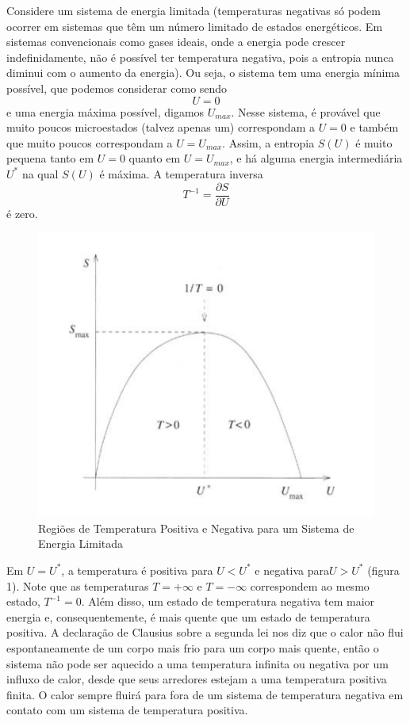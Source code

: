 \documentclass[12pt]{article}
\begin{document}
\begin{itemize}
     Considere um sistema de energia limitada (temperaturas negativas só podem ocorrer em sistemas que têm um número limitado de estados energéticos. Em sistemas convencionais como gases ideais, onde a energia pode crescer indefinidamente, não é possível ter temperatura negativa, pois a entropia nunca diminui com o aumento da energia). Ou seja, o sistema tem uma energia mínima possível, que podemos considerar como sendo
     \[
     U = 0
     \]
     e uma energia máxima possível, digamos $U_{max}$. Nesse sistema, é provável que muito poucos microestados (talvez apenas um) correspondam a $U = 0$ e também que muito poucos correspondam a $U = U_{max}$. Assim, a entropia $S(U)$ é muito pequena tanto em $U = 0$ quanto em $U = U_{max}$, e há alguma energia intermediária $U^{*}$ na qual $S(U)$ é máxima. A temperatura inversa 
     \[
     T^{-1} = \frac{\partial S}{\partial U}
     \]
     é zero.
     \begin{figure}
         \centering
         \includegraphics[width=0.5\linewidth]{image.png}
         \caption{Regiões de Temperatura Positiva e Negativa para um Sistema de Energia Limitada}
         \label{fig:enter-label}
     \end{figure}
Em $U = U^{*}$, a temperatura é positiva para $U < U^{*}$ e negativa para$ U > U^{*}$ (figura 1). Note que as temperaturas $T = +\infty$ e $T = -\infty $ correspondem ao mesmo estado, $T^{-1} = 0$. Além disso, um estado de temperatura negativa tem maior energia e, consequentemente, é mais quente que um estado de temperatura positiva. A declaração de Clausius sobre a segunda lei nos diz que o calor não flui espontaneamente de um corpo mais frio para um corpo mais quente, então o sistema não pode ser aquecido a uma temperatura infinita ou negativa por um influxo de calor, desde que seus arredores estejam a uma temperatura positiva finita. O calor sempre fluirá para fora de um sistema de temperatura negativa em contato com um sistema de temperatura positiva.


\end{itemize}
\end{document}
